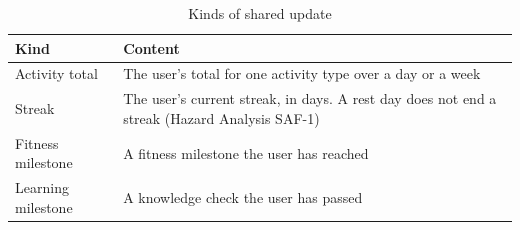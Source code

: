 \documentclass[12pt]{article}
\begin{document}
\begin{table}[H]
\caption{Kinds of shared update} \label{TblShareable}
\small
\begin{tabularx}{\textwidth}{>{\raggedright\arraybackslash}p{}X}
\toprule
\textbf{Kind} & \textbf{Content}\\
\midrule
Activity total & The user's total for one activity type over a day or a
week\\
Streak & The user's current streak, in days. A rest day does not end a
streak (Hazard Analysis SAF-1)\\
Fitness milestone & A fitness milestone the user has reached\\
Learning milestone & A knowledge check the user has passed\\
\bottomrule
\end{tabularx}
\end{table}
\end{document}
